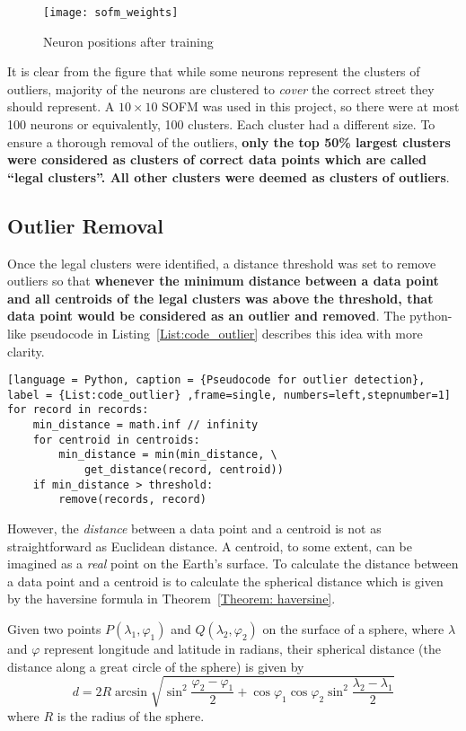 \begin{figure}[h]
\texttt{[image: sofm\_weights]}
\centering
\caption{Neuron positions after training}\label{Fig:sofm_weights}
\end{figure}

It is clear from the figure that while some neurons represent the clusters of outliers, majority of the neurons are clustered to \emph{cover} the correct street they should represent. A $10\times10$ SOFM was used in this project, so there were at most 100 neurons or equivalently, 100 clusters. Each cluster had a different size. To ensure a thorough removal of the outliers, \textbf{only the top 50\% largest clusters were considered as clusters of correct data points which are called ``legal clusters''. All other clusters were deemed as clusters of outliers}. 

\subsection{Outlier Removal}
Once the legal clusters were identified, a distance threshold was set to remove outliers so that \textbf{whenever the minimum distance between a data point and all centroids of the legal clusters was above the threshold, that data point would be considered as an outlier and removed}. The python-like pseudocode in Listing~\ref{List:code_outlier} describes this idea with more clarity.

\begin{lstlisting}[language = Python, caption = {Pseudocode for outlier detection}, label = {List:code_outlier} ,frame=single, numbers=left,stepnumber=1]
for record in records:
	min_distance = math.inf // infinity
	for centroid in centroids:
		min_distance = min(min_distance, \
			get_distance(record, centroid))
	if min_distance > threshold:
		remove(records, record)
\end{lstlisting}

However, the \emph{distance} between a data point and a centroid is not as straightforward as Euclidean distance. A centroid, to some extent, can be imagined as a \emph{real} point on the Earth's surface. To calculate the distance between a data point and a centroid is to calculate the spherical distance which is given by the haversine formula in Theorem~\ref{Theorem: haversine}. 

\begin{theorem}\label{Theorem: haversine}
Given two points $P(\lambda_1,\varphi_1)$ and $Q(\lambda_2,\varphi_2)$ on the surface of a sphere, where $\lambda$ and $\varphi$ represent longitude and latitude in radians, their spherical distance (the distance along a great circle of the sphere) is given by\cite{FI06}
\begin{equation}
d = 2R\arcsin{\sqrt{\sin^2\frac{\varphi_2 - \varphi_1}{2} + \cos\varphi_1\cos\varphi_2\sin^2\frac{\lambda_2 - \lambda_1}{2}}} 
\end{equation}
where $R$ is the radius of the sphere. 
\end{theorem}

